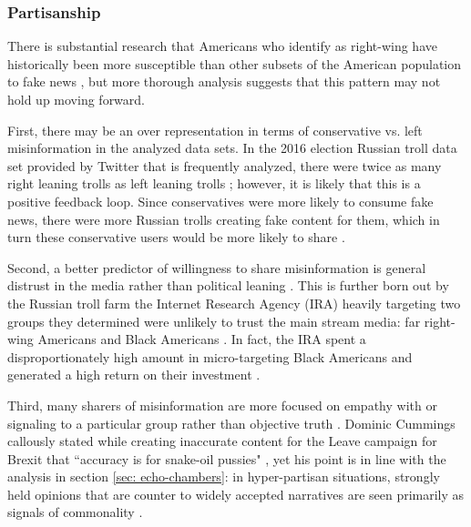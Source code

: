 \documentclass[preprint,review,12pt]{elsarticle}
\begin{document}
\subsubsection{Partisanship} 
\label{Partisanship Section}
There is substantial research that Americans who identify as right-wing have historically been more susceptible than other subsets of the American population to fake news \cite{guess2019less,benkler2018network,grinberg2019fake,allcott2017social,badawy2018analyzing}, but more thorough analysis suggests that this pattern may not hold up moving forward.

First, there may be an over representation in terms of conservative vs. left misinformation in the analyzed data sets. In the 2016 election Russian troll data set provided by Twitter that is frequently analyzed, there were twice as many right leaning trolls as left leaning trolls \cite{freelon2020black,badawy2018analyzing,benkler2018network}; however, it is likely that this is a positive feedback loop. Since conservatives were more likely to consume fake news, there were more Russian trolls creating fake content for them, which in turn these conservative users would be more likely to share \cite{bakir2018fake,bodo2019interested,silverman2016analysis,pariser2011filter}. 

Second, a better predictor of willingness to share misinformation is general distrust in the media rather than political leaning \cite{hopp2020people,shin2017partisan,kahan2012ideology,lewandowsky2016motivated,swire2017processing,mourao2019fake}. This is further born out by the Russian troll farm the Internet Research Agency (IRA) heavily targeting two groups they determined were unlikely to trust the main stream media: far right-wing Americans and Black Americans \cite{diresta2019tactics,howard2019ira,boatwright2018troll,jamieson2020cyberwar,mueller2019mueller,freelon2020black}. In fact, the IRA spent a disproportionately high amount in micro-targeting Black Americans and generated a high return on their investment \cite{howard2019ira,freelon2020black}.

Third, many sharers of misinformation are more focused on empathy with or signaling to a particular group rather than objective truth \cite{winter2015they,rheault2016measuring,dale2017nlp, connelly2011signaling,lampe2007familiar,spence2002signaling}. Dominic Cummings callously stated while creating inaccurate content for the Leave campaign for Brexit that ``accuracy is for snake-oil pussies" \cite{crace2016accuracy}, yet his point is in line with the analysis in section \ref{sec: echo-chambers}: in hyper-partisan situations, strongly held opinions that are counter to widely accepted narratives are seen primarily as signals of commonality \cite{yla2018populist,noppari2019user,lazer2018science,yla2019politicization,wasilewski2019us,freelon2020russian}. 
\end{document}
